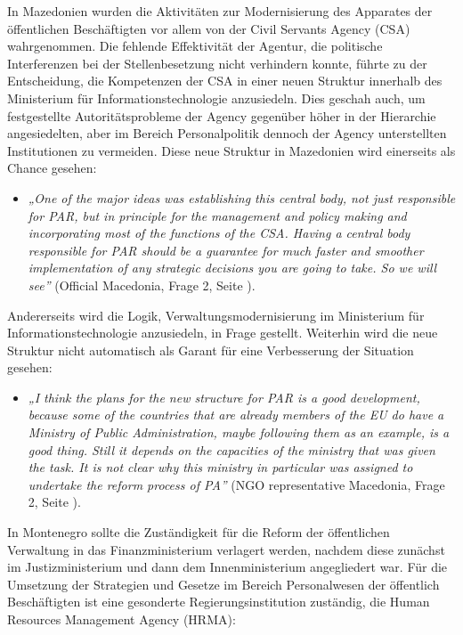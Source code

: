 In Mazedonien wurden die Aktivitäten zur Modernisierung des Apparates der öffentlichen Beschäftigten vor allem von der Civil Servants Agency (CSA) wahrgenommen. Die fehlende Effektivität der Agentur, die politische Interferenzen bei der Stellenbesetzung nicht verhindern konnte, führte zu der Entscheidung, die Kompetenzen der CSA in einer neuen Struktur innerhalb des Ministerium für Informationstechnologie anzusiedeln. Dies geschah auch, um festgestellte Autoritätsprobleme der Agency gegenüber höher in der Hierarchie angesiedelten, aber im Bereich Personalpolitik dennoch der Agency unterstellten Institutionen zu vermeiden. Diese neue Struktur in Mazedonien wird einerseits als Chance gesehen:
\begin{itemize}[label={}]
\item \textit{„One of the major ideas was establishing this central body, not just responsible for PAR, but in principle for the management and policy making and incorporating most of the functions of the CSA. Having a central body responsible for PAR should be a guarantee for much faster and smoother implementation of any strategic decisions you are going to take. So we will see”} (Official Macedonia, Frage 2, Seite \pageref{sec:par ahead}).
\end{itemize}
Andererseits wird die Logik, Verwaltungsmodernisierung im Ministerium für Informationstechnologie anzusiedeln, in Frage gestellt. Weiterhin wird die neue Struktur nicht automatisch als Garant für eine Verbesserung der Situation gesehen:
\begin{itemize}[label={}]
\item \textit{„I think the plans for the new structure for PAR is a good development, because some of the countries that are already members of the EU do have a Ministry of Public Administration, maybe following them as an example, is a good thing. Still it depends on the capacities of the ministry that was given the task. It is not clear why this ministry in particular was assigned to undertake the reform process of PA”} (NGO representative Macedonia, Frage 2, Seite \pageref{sec:par ahead}).
\end{itemize}
In Montenegro sollte die Zuständigkeit für die Reform der öffentlichen Verwaltung in das Finanzministerium verlagert werden, nachdem diese zunächst im Justizministerium und dann dem Innenministerium angegliedert war. Für die Umsetzung der Strategien und Gesetze im Bereich Personalwesen der öffentlich Beschäftigten ist eine gesonderte Regierungsinstitution zuständig, die Human Resources Management Agency (HRMA):
